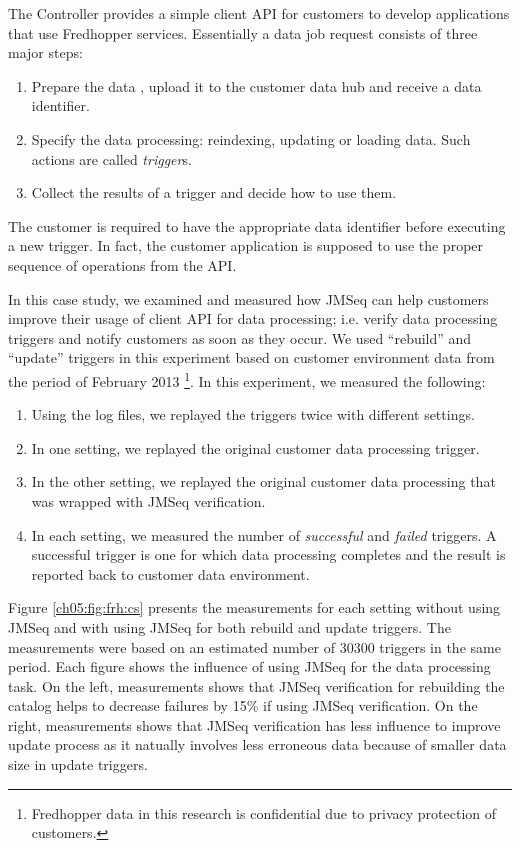 The Controller provides a simple client API for customers to develop applications that use Fredhopper services.
Essentially a data job request consists of three major steps:
\begin{enumerate}
 \item Prepare the data , upload it to the customer data hub and receive a data identifier.
 \item Specify the data processing: reindexing, updating or loading data. Such actions are called \emph{trigger}s.
 \item Collect the results of a trigger and decide how to use them.
\end{enumerate}
The customer is required to have the appropriate data identifier before executing a new trigger. In fact, the customer application
is supposed to use the proper sequence of operations from the API.

In this case study, we examined and measured how JMSeq can help customers improve their usage of client API for data processing; 
i.e. verify data processing triggers and notify customers as soon as they occur.
We used ``rebuild'' and ``update'' triggers in this experiment based on customer environment data from the period of February 2013
\footnote{Fredhopper data in this research is confidential due to privacy protection of customers.}.
In this experiment, we measured the following:
\begin{enumerate}
\item Using the log files, we replayed the triggers twice with different settings.
\item In one setting, we replayed the original customer data processing trigger.
\item In the other setting, we replayed the original customer data processing that was wrapped with JMSeq verification.
\item In each setting, we measured the number of \emph{successful} and \emph{failed} triggers. 
A successful trigger is one for which data processing completes and the result is reported back to customer data environment.
\end{enumerate}

Figure \ref{ch05:fig:frh:cs} presents the measurements for each setting without using JMSeq and with using JMSeq for both rebuild and update triggers.
The measurements were based on an estimated number of 30300 triggers in the same period.
Each figure shows the influence of using JMSeq for the data processing task.
On the left, measurements shows that JMSeq verification for rebuilding the catalog helps to decrease failures by 15\% if using JMSeq verification.
On the right, measurements shows that JMSeq verification has less influence to improve update process as it natually involves less erroneous data because of smaller data size in update triggers.

